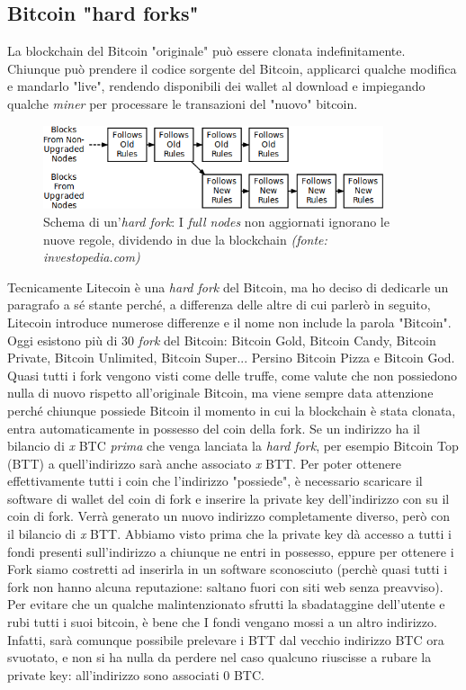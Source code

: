 \documentclass {article}
\begin{document}
\subsection {Bitcoin "hard forks"}


La blockchain del Bitcoin "originale" può essere clonata indefinitamente. Chiunque può prendere il codice sorgente del Bitcoin, applicarci qualche modifica e mandarlo "live", rendendo disponibili dei wallet al download e impiegando qualche \textit{miner} per processare le transazioni del "nuovo" bitcoin.

\vspace {0.5cm}
\begin{figure}[htb!]
\includegraphics [width = 10cm] {hard_fork.png}
\centering
\caption {Schema di un'\textit{hard fork}: I \textit{full nodes} non aggiornati ignorano le nuove regole, dividendo in due la blockchain \textit{(fonte: investopedia.com)}}
\end{figure}
\vspace {0.2cm}
\noindent
%
Tecnicamente Litecoin è una \textit{hard fork} del Bitcoin, ma ho deciso di dedicarle un paragrafo a sé stante perché, a differenza delle altre di cui parlerò in seguito, Litecoin introduce numerose differenze e il nome non include la parola "Bitcoin".
Oggi esistono più di 30 \textit{fork} del Bitcoin: Bitcoin Gold, Bitcoin Candy, Bitcoin Private, Bitcoin Unlimited, Bitcoin Super... Persino Bitcoin Pizza e Bitcoin God.
Quasi tutti i fork vengono visti come delle truffe, come valute che non possiedono nulla di nuovo rispetto all'originale Bitcoin, ma viene sempre data attenzione perché chiunque possiede Bitcoin il momento in cui la blockchain è stata clonata, entra automaticamente in possesso del coin della fork.
Se un indirizzo ha il bilancio di \textit{x} BTC \emph{prima} che venga lanciata la \textit{hard fork}, per esempio Bitcoin Top (BTT) a quell'indirizzo sarà anche associato \textit{x} BTT.
Per poter ottenere effettivamente tutti i coin che l'indirizzo "possiede", è necessario scaricare il software di wallet del coin di fork e inserire la private key dell'indirizzo con su il coin di fork.
Verrà generato un nuovo indirizzo completamente diverso, però con il bilancio di \textit{x} BTT.
Abbiamo visto prima che la private key dà accesso a tutti i fondi presenti sull'indirizzo a chiunque ne entri in possesso, eppure per ottenere i Fork siamo costretti ad inserirla in un software sconosciuto (perchè quasi tutti i fork non hanno alcuna reputazione: saltano fuori con siti web senza preavviso).
Per evitare che un qualche malintenzionato sfrutti la sbadataggine dell'utente e rubi tutti i suoi bitcoin, è bene che I fondi vengano mossi a un altro indirizzo.
Infatti, sarà comunque possibile prelevare i BTT dal vecchio indirizzo BTC ora svuotato, e non si ha nulla da perdere nel caso qualcuno riuscisse a rubare la private key: all'indirizzo sono associati 0 BTC.
\end{document}
